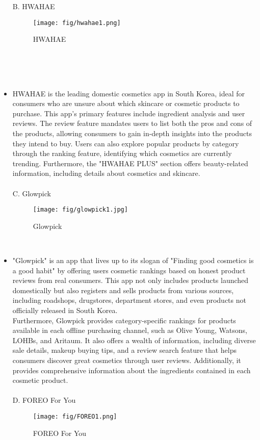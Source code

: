 \documentclass[conference]{IEEEtran}
\begin{document}
\begin{itemize}
B. HWAHAE
\begin{figure} [h]
    \texttt{[image: fig/hwahae1.png]}
    \caption{HWAHAE}
\end{figure}
\\
\\
\\
\item HWAHAE is the leading domestic cosmetics app in South Korea, ideal for consumers who are unsure about which skincare or cosmetic products to purchase. This app's primary features include ingredient analysis and user reviews. The review feature mandates users to list both the pros and cons of the products, allowing consumers to gain in-depth insights into the products they intend to buy. Users can also explore popular products by category through the ranking feature, identifying which cosmetics are currently trending. Furthermore, the "HWAHAE PLUS" section offers beauty-related information, including details about cosmetics and skincare.
\\
\\
C. Glowpick
\begin{figure} [h]
    \texttt{[image: fig/glowpick1.jpg]}
    \caption{Glowpick}
\end{figure}
\\
\item "Glowpick" is an app that lives up to its slogan of "Finding good cosmetics is a good habit" by offering users cosmetic rankings based on honest product reviews from real consumers. This app not only includes products launched domestically but also registers and sells products from various sources, including roadshops, drugstores, department stores, and even products not officially released in South Korea.\\Furthermore, Glowpick provides category-specific rankings for products available in each offline purchasing channel, such as Olive Young, Watsons, LOHBs, and Aritaum. It also offers a wealth of information, including diverse sale details, makeup buying tips, and a review search feature that helps consumers discover great cosmetics through user reviews. Additionally, it provides comprehensive information about the ingredients contained in each cosmetic product.
\\
\\
D. FOREO For You
\begin{figure} [h]
    \texttt{[image: fig/FOREO1.png]}
    \caption{FOREO For You}
\end{figure}

\end{itemize}
\end{document}

